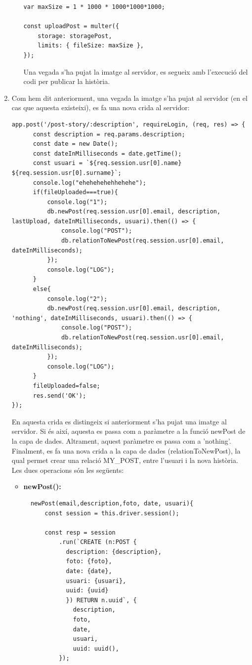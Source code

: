 \documentclass[11pt,catalan,listoffigures,listoftables]{tfgetsinf}
\begin{document}
\begin{enumerate}
\begin{enumerate}
\begin{lstlisting}
var maxSize = 1 * 1000 * 1000*1000*1000;

const uploadPost = multer({
    storage: storagePost,
    limits: { fileSize: maxSize },
});
\end{lstlisting}
Una vegada s'ha pujat la imatge al servidor, es segueix amb l'execució del codi per publicar la història.
\end{enumerate}
\item Com hem dit anteriorment, una vegada la imatge s'ha pujat al servidor (en el cas que aquesta existeixi), es fa una nova crida al servidor:
\begin{lstlisting}
app.post('/post-story/:description', requireLogin, (req, res) => {
      const description = req.params.description;
      const date = new Date();
      const dateInMilliseconds = date.getTime();
      const usuari = `${req.session.usr[0].name} ${req.session.usr[0].surname}`;
      console.log("ehehehehehhehehe");
      if(fileUploaded===true){
          console.log("1");
          db.newPost(req.session.usr[0].email, description, lastUpload, dateInMilliseconds, usuari).then(() => {
              console.log("POST");
              db.relationToNewPost(req.session.usr[0].email, dateInMilliseconds);
          });
          console.log("LOG");
      }
      else{
          console.log("2");
          db.newPost(req.session.usr[0].email, description, 'nothing', dateInMilliseconds, usuari).then(() => {
              console.log("POST");
              db.relationToNewPost(req.session.usr[0].email, dateInMilliseconds);
          });
          console.log("LOG");
      }
      fileUploaded=false;
      res.send('OK');
});
\end{lstlisting}
En aquesta crida es distingeix si anteriorment s'ha pujat una imatge al servidor. Si és així, aquesta es passa com a paràmetre a la funció newPost de la capa de dades. Altrament, aquest paràmetre es passa com a 'nothing'. Finalment, es fa una nova crida a la capa de dades (relationToNewPost), la qual permet crear una relació MY\_POST, entre l'usuari i la nova història. Les dues operacions són les següents:
\begin{itemize}
\item \textbf{newPost():}
\begin{lstlisting}
  newPost(email,description,foto, date, usuari){
      const session = this.driver.session();

      const resp = session
          .run(`CREATE (n:POST {
            description: {description},
            foto: {foto},
            date: {date},
            usuari: {usuari},
            uuid: {uuid}
            }) RETURN n.uuid`, {
              description,
              foto,
              date,
              usuari,
              uuid: uuid(),
          });


\end{lstlisting}
\end{itemize}
\end{enumerate}
\end{document}
